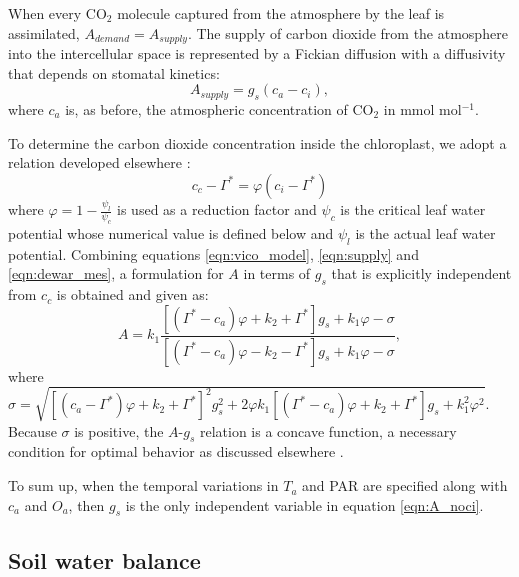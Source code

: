 \documentclass[utf8]{frontiersSCNS} %
\begin{document}
When every CO$_2$ molecule captured from the atmosphere by the leaf is assimilated, $A_{demand} = A_{supply}$. The supply of carbon dioxide from the atmosphere into the intercellular space is represented by a Fickian diffusion  with a diffusivity that depends on stomatal kinetics:
\begin{equation}
    \label{eqn:supply}
    A_{supply} = g_s (c_a - c_i),
\end{equation}
where $c_a$ is, as before, the atmospheric concentration of CO$_2$ in mmol mol$^{-1}$.

To determine the carbon dioxide concentration inside the chloroplast, we adopt a relation developed elsewhere \citep{dewar2018new}:
\begin{equation}
    \label{eqn:dewar_mes}
    c_c - \Gamma^* = \varphi(c_i - \Gamma^*)
\end{equation}
where $\varphi = 1 - \frac{\psi_l}{\psi_c}$ is used as a reduction factor and $\psi_c$ is the critical leaf water potential whose numerical value is defined below and $\psi_l$ is the actual leaf water potential. 
Combining equations \ref{eqn:vico_model}, \ref{eqn:supply} and \ref{eqn:dewar_mes}, a formulation for $A$ in terms of $g_s$ that is explicitly independent from $c_c$ is obtained and given as:
\begin{equation}
    \label{eqn:A_noci}
    A = k_1\frac{[(\Gamma^* - c_a)\varphi + k_2 + \Gamma^*]g_s + k_1\varphi - \sigma}{[(\Gamma^* - c_a)\varphi - k_2 - \Gamma^*]g_s + k_1\varphi - \sigma},
\end{equation}
where $\sigma = \sqrt{[(c_a - \Gamma^*)\varphi + k_2 + \Gamma^*]^2g_s^2 + 2{\varphi}{k_1}[(\Gamma^* - c_a)\varphi + k_2 + \Gamma^*]g_s + k_1^2\varphi^2}$.  Because $\sigma$ is positive, the $A$-$g_s$ relation is a concave function, a necessary condition for optimal behavior as discussed elsewhere \citep{katul_stomatal_2009}.

To sum up, when the temporal variations in $T_a$ and PAR are specified along with $c_a$ and $O_a$, then $g_s$ is the only independent variable in equation \ref{eqn:A_noci}.

\subsection{Soil water balance}

\end{document}
